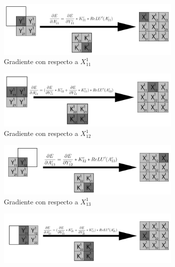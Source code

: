 \begin{figure}[H]
	\centering
	\begin{subfigure}{.5\textwidth}
		\hspace{-25mm}
		\includegraphics[width=1.4\linewidth]{imagenes/conv_back_entrada_1.jpg}  
		\caption{Gradiente con respecto a $X^1_{11}$}
	\end{subfigure}%
	\begin{subfigure}{.5\textwidth}
		\hspace{5mm}
		\includegraphics[width=1.4\linewidth]{imagenes/conv_back_entrada_2.jpg}  
		\caption{Gradiente con respecto a $X^1_{12}$}
	\end{subfigure}
	\vspace{5mm}
	\begin{subfigure}{.5\textwidth}
		\hspace{-25mm}
		\includegraphics[width=1.4\linewidth]{imagenes/conv_back_entrada_3.jpg}  
		\caption{Gradiente con respecto a $X^1_{13}$}
	\end{subfigure}%
	\begin{subfigure}{.5\textwidth}
		\hspace{5mm}
		\includegraphics[width=1.4\linewidth]{imagenes/conv_back_entrada_4.jpg}  

\end{subfigure}
\end{figure}
